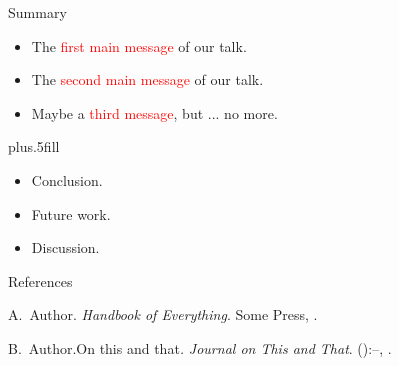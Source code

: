 \documentclass{beamer}
\begin{document}
\begin{frame}{Summary}
	\begin{itemize}
		\item The \textcolor{red}{first main message} of our talk.
		\item The \textcolor{red}{second main message} of our talk.
		\item Maybe a \textcolor{red}{third message}, but ... no more.
	\end{itemize}
	\vskip0pt plus.5fill
	\begin{itemize}
		\item Conclusion.
	\end{itemize}
	\begin{itemize}
		\item Future work.
		\item Discussion.
	\end{itemize}
\end{frame}

\begin{frame}{References}
	\begin{thebibliography}{2}
		\beamertemplatebookbibitems
		A.\ Author. \newblock\emph{Handbook of Everything}.\newblock
\textlatin{Some Press, }.

		\beamertemplatearticlebibitems
		B.\ Author.\newblock On this and that\emph{.}
\newblock\emph{Journal on This and That}. 
():--, 
.
	\end{thebibliography}
\end{frame}

\end{document}
